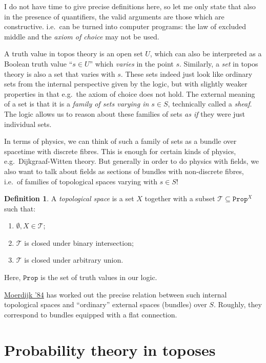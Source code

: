 \documentclass[11pt, oneside, article]{memoir}
\theoremstyle{plain}
\theoremstyle{definition}
\newtheorem{definition}[theorem]{Definition}
\theoremstyle{remark}
\newcommand{\const}[1]{\mathtt{#1}}
\newcommand{\Prop}{\const{Prop}}
\begin{document}
I do not have time to give precise definitions here, so let me only state that also in the presence of quantifiers, the valid arguments are those which are constructive. i.e.~can be turned into computer programs: the law of excluded middle and the \emph{axiom of choice} may not be used.

A truth value in topos theory is an open set $U$, which can also be interpreted as a Boolean truth value ``$s\in U$'' which \emph{varies} in the point $s$. Similarly, a \emph{set} in topos theory is also a set that varies with $s$. These sets indeed just look like ordinary sets from the internal perspective given by the logic, but with slightly weaker properties in that e.g.~the axiom of choice does not hold. The external meaning of a set is that it is a \emph{family of sets varying in $s\in S$}, technically called a \emph{sheaf}. The logic allows us to reason about these families of sets \emph{as if} they were just individual sets.

In terms of physics, we can think of such a family of sets as a bundle over spacetime with discrete fibres. This is enough for certain kinds of physics, e.g.~Dijkgraaf-Witten theory. But generally in order to do physics with fields, we also want to talk about fields as sections of bundles with non-discrete fibres, i.e.~of families of topological spaces varying with $s \in S$!

\begin{definition}
A \emph{topological space} is a set $X$ together with a subset $\mathcal{T} \subseteq \Prop^X$ such that:
\begin{enumerate}
\item $\emptyset,X\in\mathcal{T}$;
\item $\mathcal{T}$ is closed under binary intersection;
\item $\mathcal{T}$ is closed under arbitrary union.
\end{enumerate}
\end{definition}

Here, $\Prop$ is the set of truth values in our logic.

\href{http://www.numdam.org/item?id=CM_1984__53_2_171_0}{Moerdijk '84} has worked out the precise relation between such internal topological spaces and ``ordinary'' external spaces (bundles) over $S$. Roughly, they correspond to bundles equipped with a flat connection.

\chapter{Probability theory in toposes}
\end{document}
